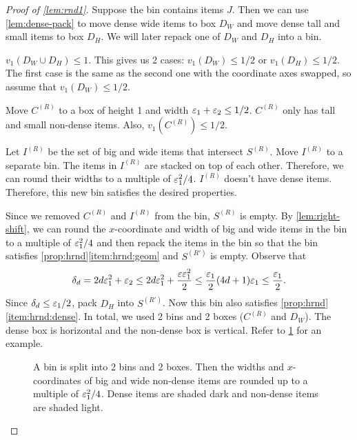 \begin{proof}[Proof of \cref{lem:rnd1}]
Suppose the bin contains items $J$. Then we can use \cref{lem:dense-pack} to move
dense wide items to box $D_W$ and move dense tall and small items to box $D_H$.
We will later repack one of $D_W$ and $D_H$ into a bin.

$v_1(D_W \cup D_H) \le 1$. This gives us 2 cases:
$v_1(D_W) \le 1/2$ or $v_1(D_H) \le 1/2$.
The first case is the same as the second one with the coordinate axes swapped,
so assume \wLoG{} that $v_1(D_W) \le 1/2$.

Move $C^{(R)}$ to a box of height 1 and width $\varepsilon_1 + \varepsilon_2 \le 1/2$.
$C^{(R)}$ only has tall and small non-dense items. Also, $v_1(C^{(R)}) \le 1/2$.

Let $I^{(R)}$ be the set of big and wide items that intersect $S^{(R)}$.
Move $I^{(R)}$ to a separate bin.
The items in $I^{(R)}$ are stacked on top of each other.
Therefore, we can round their widths to a multiple of $\varepsilon_1^2/4$.
$I^{(R)}$ doesn't have dense items.
Therefore, this new bin satisfies the desired properties.

Since we removed $C^{(R)}$ and $I^{(R)}$ from the bin, $S^{(R)}$ is empty.
By \cref{lem:right-shift}, we can round the $x$-coordinate and width of big and wide items
in the bin to a multiple of $\varepsilon_1^2/4$ and then repack the items in the bin so that
the bin satisfies \cref{prop:hrnd}\ref{item:hrnd:geom} and $S^{(R')}$ is empty.
Observe that
\[ \delta_d = 2d\varepsilon_1^2 + \varepsilon_2
\le 2d\varepsilon_1^2 + \frac{\varepsilon\varepsilon_1^2}{2}
\le \frac{\varepsilon_1}{2} (4d+1)\varepsilon_1 \le \frac{\varepsilon_1}{2}. \]
Since $\delta_d \le \varepsilon_1/2$, pack $D_H$ into $S^{(R')}$.
Now this bin also satisfies \cref{prop:hrnd}\ref{item:hrnd:dense}.
In total, we used 2 bins and 2 boxes ($C^{(R)}$ and $D_W$).
The dense box is horizontal and the non-dense box is vertical.
Refer to \cref{fig:split-bin} for an example.
\begin{figure}[htb]
\centering

\caption[Splitting a bin into 2 bins and 2 boxes.]{A bin is split into 2 bins and 2 boxes.
Then the widths and $x$-coordinates of big and wide non-dense items
are rounded up to a multiple of $\varepsilon_1^2/4$.
Dense items are shaded dark and non-dense items are shaded light.}
\label{fig:split-bin}
\end{figure}
\end{proof}

